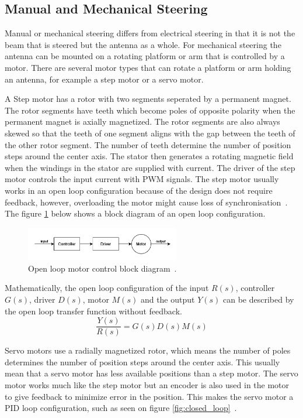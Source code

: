 \subsection{Manual and Mechanical Steering}
Manual or mechanical steering differs from electrical steering in that it is not the beam that is steered but the antenna as a whole. For mechanical steering the antenna can be mounted on a rotating platform or arm that is controlled by a motor. There are several motor types that can rotate a platform or arm holding an antenna, for example a step motor or a servo motor. 

A Step motor has a rotor with two segments seperated by a permanent magnet. The rotor segments have teeth which become poles of opposite polarity when the permanent magnet is axially magnetized. The rotor segments are also always skewed so that the teeth of one segment aligns with the gap between the teeth of the other rotor segment. The number of teeth determine the number of position steps around the center axis. The stator then generates a rotating magnetic field when the windings in the stator are supplied with current. The driver of the step motor controls the input current with PWM signals. The step motor usually works in an open loop configuration because of the design does not require feedback, however, overloading the motor might cause loss of synchronisation~\cite{servo_step}. The figure \ref{fig:open_loop} below shows a block diagram of an open loop configuration.
\begin{figure}[H]
    \centering
    \includegraphics[width=0.6\textwidth]{figures/open-loop.png}
    \caption{Open loop motor control block diagram~\cite{loop}.} \label{fig:open_loop}
\end{figure}

Mathematically, the open loop configuration of the input $R(s)$, controller $G(s)$, driver $D(s)$, motor $M(s)$ and the output $Y(s)$ can be described by the open loop transfer function without feedback.
\begin{equation}
    \frac{Y(s)}{R(s)} = G(s)D(s)M(s)
\end{equation}

Servo motors use a radially magnetized rotor, which means the number of poles determines the number of position steps around the center axis. This usually mean that a servo motor has less available positions than a step motor. The servo motor works much like the step motor but an encoder is also used in the motor to give feedback to minimize error in the position. This makes the servo motor a PID loop configuration, such as seen on figure \ref{fig:closed_loop}~\cite{servo_step}. 


